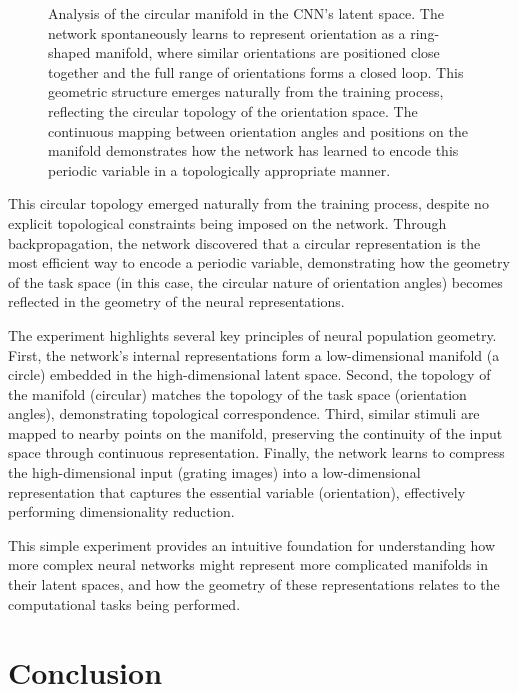 \documentclass[11pt,a4paper]{article}
\begin{document}
\begin{figure}
\begin{subfigure}[b]{0.48\textwidth}
        \label{fig:circular_regression}
    \end{subfigure}
    \caption{Analysis of the circular manifold in the CNN's latent space. The network spontaneously learns to represent orientation as a ring-shaped manifold, where similar orientations are positioned close together and the full range of orientations forms a closed loop. This geometric structure emerges naturally from the training process, reflecting the circular topology of the orientation space. The continuous mapping between orientation angles and positions on the manifold demonstrates how the network has learned to encode this periodic variable in a topologically appropriate manner.}
    \label{fig:manifold_analysis}
\end{figure}

This circular topology emerged naturally from the training process, despite no explicit topological constraints being imposed on the network. Through backpropagation, the network discovered that a circular representation is the most efficient way to encode a periodic variable, demonstrating how the geometry of the task space (in this case, the circular nature of orientation angles) becomes reflected in the geometry of the neural representations.

The experiment highlights several key principles of neural population geometry. First, the network's internal representations form a low-dimensional manifold (a circle) embedded in the high-dimensional latent space. Second, the topology of the manifold (circular) matches the topology of the task space (orientation angles), demonstrating topological correspondence. Third, similar stimuli are mapped to nearby points on the manifold, preserving the continuity of the input space through continuous representation. Finally, the network learns to compress the high-dimensional input (grating images) into a low-dimensional representation that captures the essential variable (orientation), effectively performing dimensionality reduction.

This simple experiment provides an intuitive foundation for understanding how more complex neural networks might represent more complicated manifolds in their latent spaces, and how the geometry of these representations relates to the computational tasks being performed.

\section{Conclusion}



\end{document}
